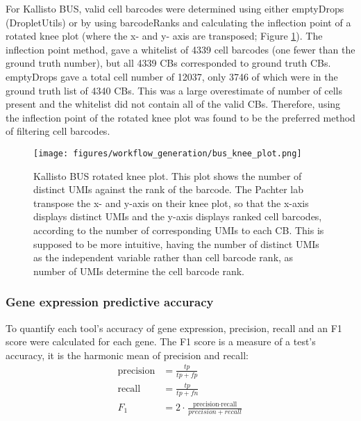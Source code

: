 For Kallisto BUS, valid cell barcodes were determined using either emptyDrops (DropletUtils) or by
using barcodeRanks and calculating the inflection point of a rotated knee plot (where the x- and y- axis are transposed; Figure \ref{fig:bus_knee}).
The inflection point method, gave a whitelist of 4339 cell barcodes (one fewer than the ground truth number), but all 4339 CBs corresponded to ground truth CBs.
emptyDrops gave a total cell number of 12037, only 3746 of which were in the ground truth list of 4340 CBs. This was a large overestimate of number of cells present and the whitelist did not contain all of the valid CBs.
Therefore, using the inflection point of the rotated knee plot was found to be the preferred method of filtering cell barcodes.

\begin{figure}[htb]
    \centering
    \texttt{[image: figures/workflow\_generation/bus\_knee\_plot.png]}
    \caption[Benchmark Kallisto Bus Rotated Knee Plot]{Kallisto BUS rotated knee plot.
    This plot shows the number of distinct UMIs against the rank of the barcode.
    The Pachter lab transpose the x- and y-axis on their knee plot, so that the x-axis displays distinct UMIs and the y-axis displays ranked cell barcodes, according to the number of corresponding UMIs to each CB. This is supposed to be more intuitive, having the number of distinct UMIs as the independent variable rather than cell barcode rank, as number of UMIs determine the cell barcode rank.}
    \label{fig:bus_knee}
\end{figure}

\subsubsection{Gene expression predictive accuracy}
To quantify each tool's accuracy of gene expression, precision, recall and an F1 score were calculated for each gene.
The F1 score is a measure of a test's accuracy, it is the harmonic mean of precision and recall:
\begin{equation}
\begin{aligned}
\text{precision} & = \frac{tp}{tp + fp}\\
%
\text{recall} & = \frac{tp}{tp + fn}\\
%
F_{1} & = 2 \cdot \frac{\text{precision} \cdot \text{recall}}{precision + recall}
\end{aligned}
\end{equation}

